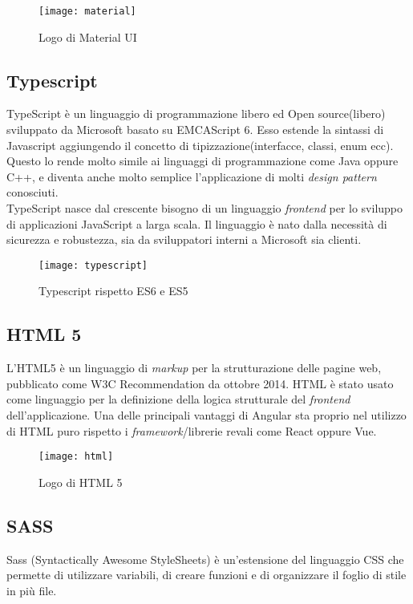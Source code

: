 \begin{figure}[!h] 
	\centering 
	\texttt{[image: material]}
	\caption{Logo di Material UI} 
\end{figure}


\subsection{Typescript} TypeScript è un linguaggio di programmazione libero ed Open source(libero) sviluppato da Microsoft basato su \gls{EMCAScript 6}. Esso estende la sintassi di \gls{Javascript} aggiungendo il concetto di tipizzazione(interfacce, classi, enum ecc). Questo lo rende molto simile ai linguaggi di programmazione come Java oppure C++, e diventa anche molto semplice l'applicazione di molti \emph{design pattern} conosciuti.
\\

TypeScript nasce dal crescente bisogno di un linguaggio \emph{frontend} per lo sviluppo di applicazioni JavaScript a larga scala. Il linguaggio è nato dalla necessità di sicurezza e robustezza, sia da sviluppatori interni a Microsoft sia clienti. 
\begin{figure}[!h] 
	\centering 
	\texttt{[image: typescript]} 
	\caption{Typescript rispetto ES6 e ES5}
\end{figure}


\subsection{HTML 5} L'HTML5 è un linguaggio di \emph{markup} per la strutturazione delle pagine web, pubblicato come \gls{W3C Recommendation} da ottobre 2014. HTML è stato usato come linguaggio per la definizione della logica strutturale del
\emph{frontend} dell’applicazione. Una delle principali vantaggi di Angular sta proprio nel utilizzo di HTML puro rispetto i \emph{framework}/librerie revali come React oppure Vue. 
\begin{figure}[!h] 
	\centering 
	\texttt{[image: html]} 
	\caption{Logo di HTML 5}
\end{figure}

\subsection{SASS} Sass (Syntactically Awesome StyleSheets) è un'estensione del linguaggio CSS che permette di utilizzare variabili, di creare funzioni e di organizzare il foglio di stile in più file.
\\

